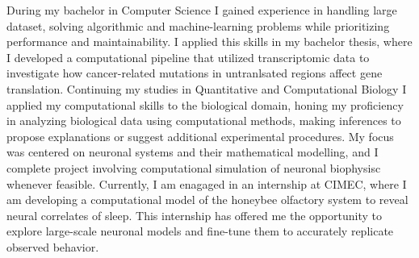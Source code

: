 



During my bachelor in Computer Science I gained experience in handling large dataset, solving algorithmic and machine-learning problems while prioritizing performance and maintainability.
I applied this skills in my bachelor thesis, where I developed a computational pipeline that utilized transcriptomic data to investigate how cancer-related mutations in untranlsated regions affect gene translation.
Continuing my studies in Quantitative and Computational Biology I applied my computational skills to the biological domain, honing my proficiency in analyzing biological data using computational methods, making inferences to propose explanations or suggest additional experimental procedures.
My focus was centered on neuronal systems and their mathematical modelling, and I complete project involving computational simulation of neuronal biophysisc whenever feasible.
Currently, I am enagaged in an internship at CIMEC, where I am developing a computational model of the honeybee olfactory system to reveal neural correlates of sleep.
This internship has offered me the opportunity to explore large-scale neuronal models and fine-tune them to accurately replicate observed behavior.
